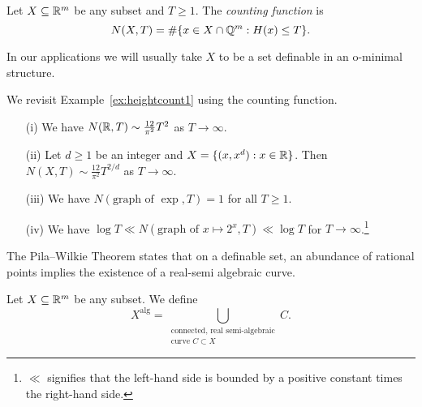 \begin{definition}
  Let $X\subseteq{\mathbb{R}}^m$ be any subset and $T\ge 1$. The \emph{counting
    function} is 
  \begin{equation*}
    N(X,T) = \#\{ x\in X\cap {\mathbb{Q}}^m : H(x)\le T\}. 
  \end{equation*}
\end{definition}

In our applications we will usually take $X$ to be a  set definable in
an o-minimal structure.

\begin{example}
  \label{ex:heightcount2}
  We revisit Example~\ref{ex:heightcount1} using the counting
  function.
  \begin{enumerate}
  \item [(i)] We have $N({\mathbb{R}},T)\sim \frac{12}{\pi^2}T^2$ as
    $T\rightarrow\infty$.
  \item [(ii)] Let $d\ge 1$ be an integer and $X= \{(x,x^d):
    x\in{\mathbb{R}}\}$. Then $N(X,T)\sim \frac{12}{\pi^2}T^{2/d}$ as
    $T\rightarrow\infty$.
  \item[(iii)] We have $N(\text{graph of }\exp,T) = 1$ for all $T\ge
    1$.
  \item [(iv)] We have $\log T \ll
    N(\text{graph of }x\mapsto 2^x,T)\ll \log T$ for $T\rightarrow\infty$.\footnote{$\ll$
      signifies that the left-hand side is bounded by a positive
      constant times the right-hand side.}
  \end{enumerate}
\end{example}

The Pila--Wilkie Theorem states that on a definable set, an abundance of
rational points implies the existence of a real-semi algebraic curve.

\begin{definition}
  Let $X\subseteq{\mathbb{R}}^m$ be any subset. We define
  \begin{equation*}
    X^{\mathrm{alg}} = \bigcup_{\substack{\text{connected, real
          semi-algebraic}\\ \text{curve }C\subset X}} C.
  \end{equation*}
\end{definition}

